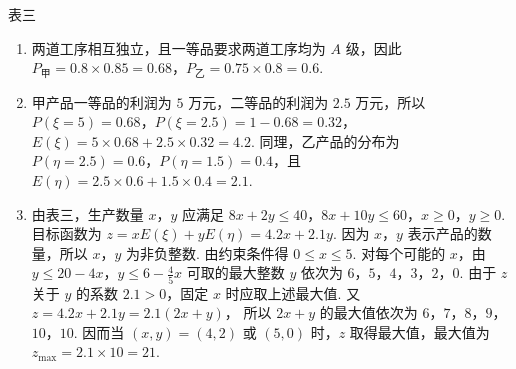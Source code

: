 \begin{problem}
\begin{enumerate}
\begin{center}
表三
\end{center}
\end{enumerate}

\begin{solution}
\begin{enumerate}
\item 两道工序相互独立，且一等品要求两道工序均为 \(A\) 级，因此
\(P_{\text{甲}}=0.8\times0.85=0.68\)，\(P_{\text{乙}}=0.75\times0.8=0.6\).

\item 甲产品一等品的利润为 \(5\) 万元，二等品的利润为 \(2.5\) 万元，所以
\(P(\xi=5)=0.68\)，\(P(\xi=2.5)=1-0.68=0.32\)，\(E(\xi)=5\times0.68+2.5\times0.32=4.2\).
同理，乙产品的分布为
\(P(\eta=2.5)=0.6\)，\(P(\eta=1.5)=0.4\)，且 \(E(\eta)=2.5\times0.6+1.5\times0.4=2.1\).

\item 由表三，生产数量 \(x\)，\(y\) 应满足
\(8x+2y\leqslant40\)，\(8x+10y\leqslant60\)，\(x\geqslant0\)，\(y\geqslant0\).
目标函数为
\(z=xE(\xi)+yE(\eta)=4.2x+2.1y\).
因为 \(x\)，\(y\) 表示产品的数量，所以 \(x\)，\(y\) 为非负整数. 由约束条件得 \(0\leqslant x\leqslant5\). 对每个可能的 \(x\)，由
\(y\leqslant20-4x\)，\(y\leqslant6-\frac45x\)
可取的最大整数 \(y\) 依次为 \(6\)，\(5\)，\(4\)，\(3\)，\(2\)，\(0\). 由于 \(z\) 关于 \(y\) 的系数 \(2.1>0\)，固定 \(x\) 时应取上述最大值. 又
\(z=4.2x+2.1y=2.1(2x+y)\)，
所以 \(2x+y\) 的最大值依次为 \(6\)，\(7\)，\(8\)，\(9\)，\(10\)，\(10\). 因而当 \((x,y)=(4,2)\) 或 \((5,0)\) 时，\(z\) 取得最大值，最大值为
\(z_{\max}=2.1\times10=21\).
\end{enumerate}
\end{solution}
\end{problem}

